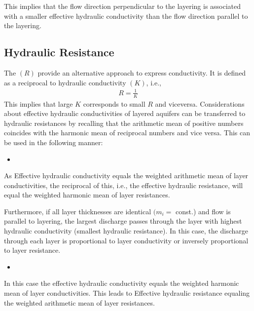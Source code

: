 \documentclass[letterpaper,10pt,english]{sphinxmanual}
\begin{document}
This implies that the flow direction perpendicular to the layering is associated with a smaller effective hydraulic conductivity than the flow direction parallel to the layering.


\subsection{Hydraulic Resistance}
\label{\detokenize{contents/flow/lecture_05/15_het_iso:hydraulic-resistance}}
The  \((R)\) provide an alternative approach to express conductivity. It is defined as a reciprocal to hydraulic conductivity \((K)\), i.e.,
\begin{equation*}
\begin{split}
R = \frac{1}{K}
\end{split}
\end{equation*}
This implies that large \(K\) corresponds to small \(R\) and vice\sphinxhyphen{}versa. Considerations about effective hydraulic conductivities of layered
aquifers can be transferred to hydraulic resistances by recalling
that the arithmetic mean of positive numbers coincides with the
harmonic mean of reciprocal numbers and vice versa. This can be used in the following manner:
\begin{itemize}
\item {} 

\end{itemize}

As Effective hydraulic conductivity equals the weighted arithmetic mean of layer conductivities, the reciprocal of this, i.e., the effective hydraulic resistance, will equal the weighted harmonic mean of layer resistances.

Furthermore, if all layer thicknesses are identical \((m_i =\) const.) and flow is parallel to layering, the largest discharge passes through the layer with
highest hydraulic conductivity (smallest hydraulic resistance). In this case, the discharge through each layer is proportional to layer conductivity or inversely proportional to layer resistance.
\begin{itemize}
\item {} 

\end{itemize}

In this case the effective hydraulic conductivity equals the weighted harmonic
mean of layer conductivities. This leads to Effective hydraulic resistance equaling the weighted arithmetic mean of layer resistances.
\end{document}
